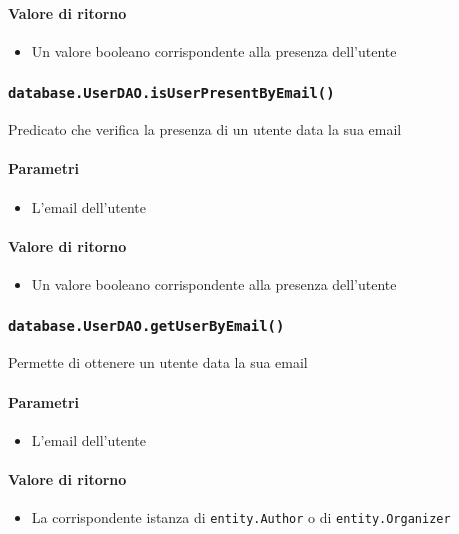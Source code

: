 \paragraph{Valore di ritorno}
\begin{itemize}
\item Un valore booleano corrispondente alla presenza dell'utente
\end{itemize}

\subsubsection{\texttt{database.UserDAO.isUserPresentByEmail()}}
Predicato che verifica la presenza di un utente data la sua email
\paragraph{Parametri}
\begin{itemize}
\item L'email dell'utente
\end{itemize}
\paragraph{Valore di ritorno}
\begin{itemize}
\item Un valore booleano corrispondente alla presenza dell'utente
\end{itemize}

\subsubsection{\texttt{database.UserDAO.getUserByEmail()}}
Permette di ottenere un utente data la sua email
\paragraph{Parametri}
\begin{itemize}
\item L'email dell'utente
\end{itemize}
\paragraph{Valore di ritorno}
\begin{itemize}
\item La corrispondente istanza di \texttt{entity.Author} o di
  \texttt{entity.Organizer}
\end{itemize}

